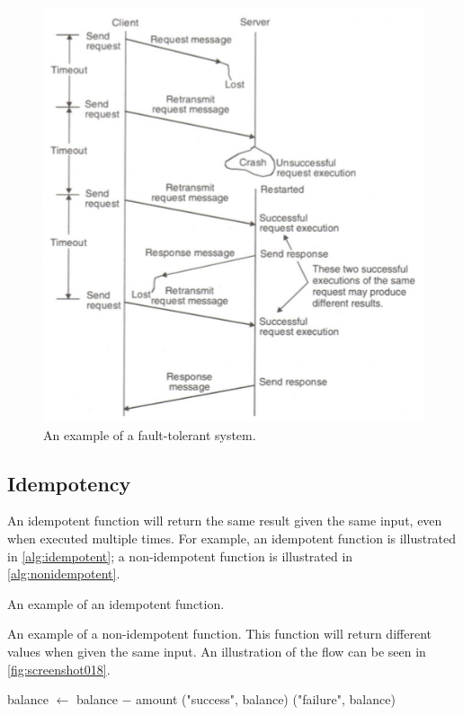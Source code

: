 \begin{figure}[h]
\centering
\includegraphics[width=0.4\linewidth]{screenshot017}
\caption{An example of a fault-tolerant system.}
\label{fig:screenshot017}
\end{figure}

\subsection{Idempotency}
\label{ssec:idempotency}
An idempotent function will return the same result given the same input, even when executed multiple times. For example, an idempotent function is illustrated in \autoref{alg:idempotent}; a non-idempotent function is illustrated in \autoref{alg:nonidempotent}.

\begin{algorithm}
\caption{An example of an idempotent function.}
\label{alg:idempotent}
\begin{algorithmic}
	\State \Return {}
\EndFunction
\end{algorithmic}
\end{algorithm}

\begin{algorithm}
\caption[Example of a non-idempotent function]{An example of a non-idempotent function. This function will return different values when given the same input. An illustration of the flow can be seen in \autoref{fig:screenshot018}.}
\label{alg:nonidempotent}
\begin{algorithmic}
		\State balance $\gets$ balance $-$ amount
		\State \Return ("success", balance)
	\Else
		\State \Return ("failure", balance)
	\EndIf
\EndFunction
\end{algorithmic}
\end{algorithm}

